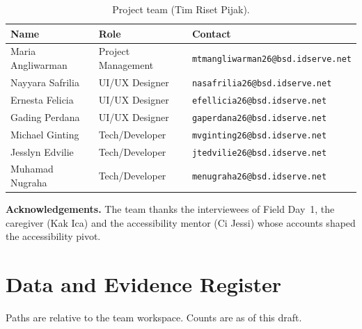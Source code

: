\documentclass[11pt,a4paper]{article}
\begin{document}
\begin{table}[H]
\centering
\small
\caption{Project team (Tim Riset Pijak).}
\label{tab:team}
\renewcommand{\arraystretch}{1.2}
\begin{tabularx}{\textwidth}{@{}l l Y@{}}
\toprule
\textbf{Name} & \textbf{Role} & \textbf{Contact} \\
\midrule
Maria Angliwarman & Project Management & \texttt{mtmangliwarman26@bsd.idserve.net} \\
Nayyara Safrilia & UI/UX Designer & \texttt{nasafrilia26@bsd.idserve.net} \\
Ernesta Felicia & UI/UX Designer & \texttt{efellicia26@bsd.idserve.net} \\
Gading Perdana & UI/UX Designer & \texttt{gaperdana26@bsd.idserve.net} \\
Michael Ginting & Tech/Developer & \texttt{mvginting26@bsd.idserve.net} \\
Jesslyn Edvilie & Tech/Developer & \texttt{jtedvilie26@bsd.idserve.net} \\
Muhamad Nugraha & Tech/Developer & \texttt{menugraha26@bsd.idserve.net} \\
\bottomrule
\end{tabularx}
\end{table}

\textbf{Acknowledgements.} The team thanks the interviewees of Field Day~1, the caregiver (Kak Ica) and
the accessibility mentor (Ci Jessi) whose accounts shaped the accessibility pivot.

\printbibliography[title={References}]

\appendix
\section{Data and Evidence Register}\label{app:register}

Paths are relative to the team workspace. Counts are as of this draft.
\end{document}
